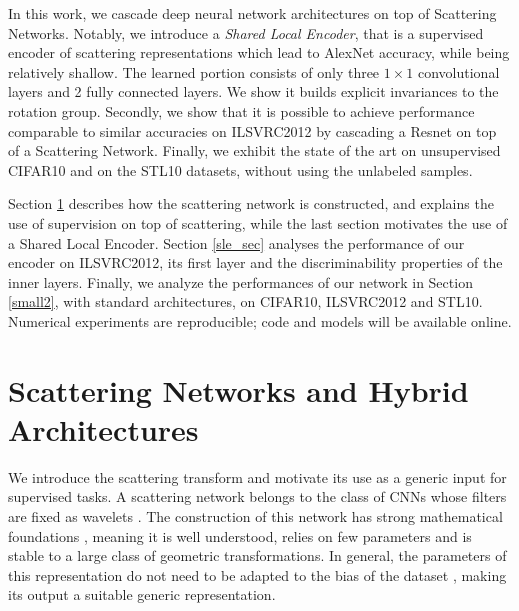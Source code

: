 \documentclass[10pt,twocolumn,letterpaper]{article}
\newcommand{\citep}{\cite}
\begin{document}
In this work, we cascade deep neural network architectures on top of Scattering Networks. Notably, we introduce a \textit{Shared Local Encoder}, that is a supervised encoder of scattering representations which lead to AlexNet accuracy, while being relatively shallow. The learned portion consists of only three $1\times 1$ convolutional layers and 2 fully connected layers. We show it builds explicit invariances to the rotation group. Secondly, we show that it is possible to achieve performance comparable to similar accuracies on ILSVRC2012 by cascading a Resnet \cite{he2015deep,zagoruyko2016wide} on top of a Scattering Network. Finally, we exhibit the state of the art on unsupervised CIFAR10 and on the STL10 datasets, without using the unlabeled samples.









Section \ref{hyb}  describes how the scattering network is constructed, and explains the use of supervision on top of scattering, while the last section motivates the use of a Shared Local Encoder. Section \ref{sle_sec} analyses the performance of our encoder on ILSVRC2012, its first layer and the discriminability properties of the inner layers. Finally, we analyze the performances of our network in Section \ref{small2}, with standard architectures, on CIFAR10, ILSVRC2012 and STL10. Numerical experiments are reproducible; code and models will be available online.
\fi




 
\section{Scattering Networks and Hybrid Architectures}
\label{hyb}









We introduce the scattering transform and motivate its use as a generic input for supervised tasks. A scattering network belongs to the class of CNNs whose filters are fixed as wavelets \citep{oyallon2015deep}. The construction of this network has strong mathematical foundations \citep{mallat2012group}, meaning it is well understood, relies on  few parameters and is stable to a large class of geometric transformations.  In general, the parameters of this representation do not need to be adapted to the bias of the dataset \citep{oyallon2015deep}, making its output a suitable generic representation.
 
\end{document}
